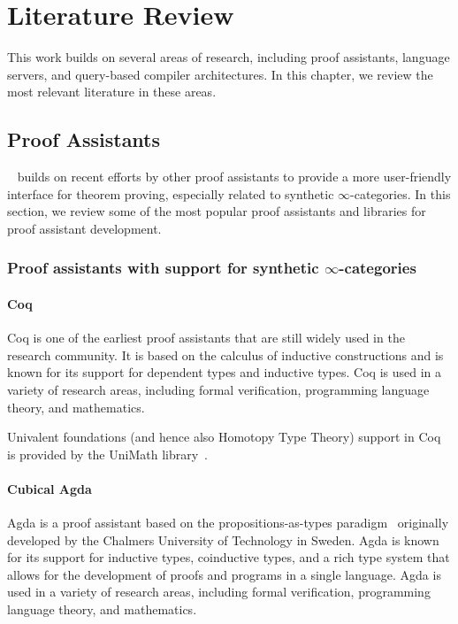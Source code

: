 \chapter{Literature Review}
\label{chap:lr}

This work builds on several areas of research, including proof assistants, language servers,
and query-based compiler architectures.
In this chapter, we review the most relevant literature in these areas.

\section{Proof Assistants}

\Rzk{}~\cite{kudasov2023experimental} builds on recent efforts by other proof assistants to provide a
more user-friendly interface for theorem proving, especially related to synthetic $\infty$-categories.
In this section, we review some of the most popular proof assistants and libraries for proof assistant development.

\subsection{Proof assistants with support for synthetic $\infty$-categories}

\subsubsection{Coq}

Coq \cite{huet1997coq} is one of the earliest proof assistants that are still widely used in the research community.
It is based on the calculus of inductive constructions and is known for its support for dependent types and inductive types.
Coq is used in a variety of research areas, including formal verification, programming language theory, and mathematics.

Univalent foundations (and hence also Homotopy Type Theory) support in Coq is provided by the UniMath library~\cite{DanielGrayson2024, MacPherson2019}.

\subsubsection{Cubical Agda}

Agda \cite{BoveDybjerNorell2009} is a proof assistant based on the propositions-as-types paradigm~\cite{Wadler2015} originally developed by the Chalmers University of Technology in Sweden.
Agda is known for its support for inductive types, coinductive types, and a rich type system that allows for the
development of proofs and programs in a single language.
Agda is used in a variety of research areas, including formal verification, programming language theory, and mathematics.

